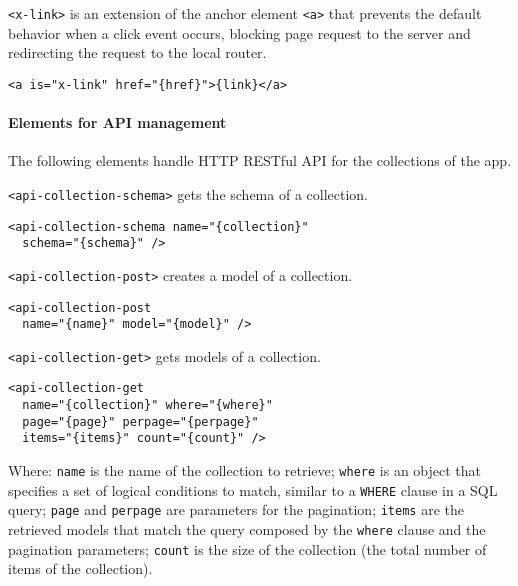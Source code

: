 \texttt{<x-link>} is an extension of the anchor element \texttt{<a>} that prevents the default behavior when a click event occurs, blocking page request to the server and redirecting the request to the local router. 

\begin{lstlisting}[language=HTML5]
<a is="x-link" href="{href}">{link}</a>
\end{lstlisting}

\paragraph{Elements for API management}

The following elements handle HTTP RESTful API for the collections of the app.

\texttt{<api-collection-schema>} gets the schema of a collection. 

\begin{lstlisting}[language=HTML5]
<api-collection-schema name="{collection}" 
  schema="{schema}" />
\end{lstlisting}

\vspace{0.2cm}

\texttt{<api-collection-post>} creates a model of a collection. 

\begin{lstlisting}[language=HTML5]
<api-collection-post 
  name="{name}" model="{model}" />
\end{lstlisting}

\vspace{0.2cm}

\texttt{<api-collection-get>} gets models of a collection. 

\begin{lstlisting}[language=HTML5]
<api-collection-get 
  name="{collection}" where="{where}" 
  page="{page}" perpage="{perpage}"  
  items="{items}" count="{count}" />
\end{lstlisting}

Where: 
\texttt{name} is the name of the collection to retrieve; 
\texttt{where} is an object that specifies a set of logical conditions to match, similar to a \texttt{WHERE} clause in a SQL query;
\texttt{page} and \texttt{perpage} are parameters for the pagination;
\texttt{items} are the retrieved models that match the query composed by the \texttt{where} clause and the pagination parameters;
\texttt{count} is the size of the collection (the total number of items of the collection).

